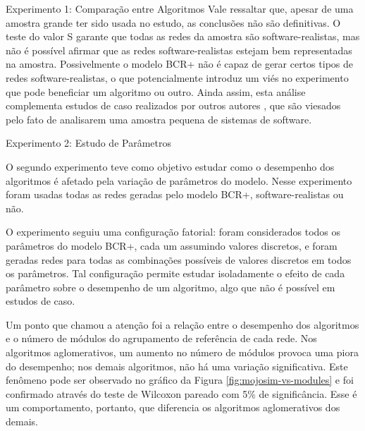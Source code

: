 \begin{section}{Experimento 1: Comparação entre Algoritmos}
Vale ressaltar que, apesar de uma amostra grande ter sido usada no estudo, as conclusões não são definitivas. O teste do valor S garante que todas as redes da amostra são software-realistas, mas não é possível afirmar que as redes software-realistas estejam bem representadas na amostra. Possivelmente o modelo BCR+ não é capaz de gerar certos tipos de redes software-realistas, o que potencialmente introduz um viés no experimento que pode beneficiar um algoritmo ou outro. Ainda assim, esta análise complementa estudos de caso realizados por outros autores \cite{Wu2005,Andritsos2005}, que são viesados pelo fato de analisarem uma amostra pequena de sistemas de software.

\end{section}

\begin{section}{Experimento 2: Estudo de Parâmetros}

O segundo experimento teve como objetivo estudar como o desempenho dos algoritmos é afetado pela variação de parâmetros do modelo. Nesse experimento foram usadas todas as redes geradas pelo modelo BCR+, software-realistas ou não.

O experimento seguiu uma configuração fatorial: foram considerados todos os parâmetros do modelo BCR+, cada um assumindo valores discretos, e foram geradas redes para todas as combinações possíveis de valores discretos em todos os parâmetros. Tal configuração permite estudar isoladamente o efeito de cada parâmetro sobre o desempenho de um algoritmo, algo que não é possível em estudos de caso.


Um ponto que chamou a atenção foi a relação entre o desempenho dos algoritmos e o número de módulos do agrupamento de referência de cada rede. Nos algoritmos aglomerativos, um aumento no número de módulos provoca uma piora do desempenho; nos demais algoritmos, não há uma variação significativa. Este fenômeno pode ser observado no gráfico da Figura \ref{fig:mojosim-vs-modules} e foi confirmado através do teste de Wilcoxon pareado com 5\% de significância. Esse é um comportamento, portanto, que diferencia os algoritmos aglomerativos dos demais. 


\end{section}
